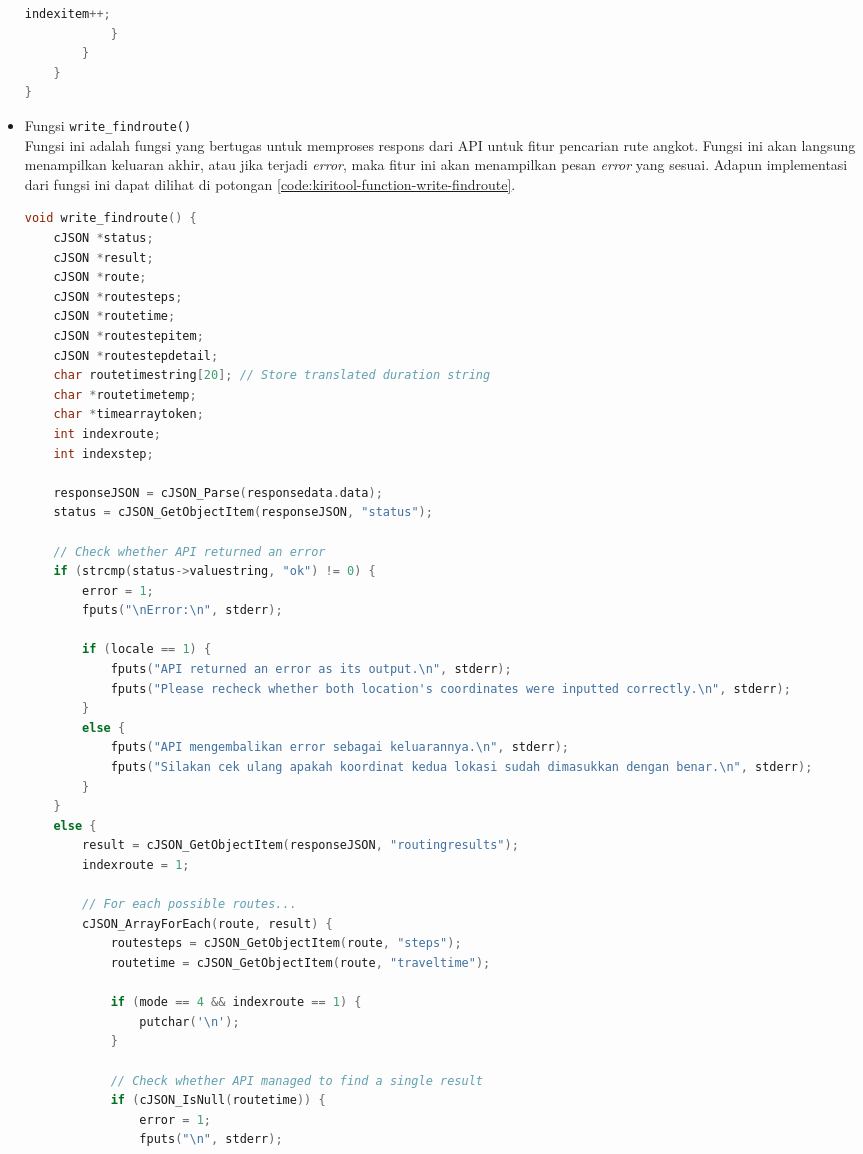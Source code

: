 \begin{itemize}[listparindent=\parindent]
\begin{lstlisting}[language=C, caption=Implementasi fungsi write\textunderscore seachplace(), label=code:kiritool-function-write-search]
                indexitem++;
            }
        }
    }
}
	\end{lstlisting}
	
	\item Fungsi \verb|write_findroute()| \\
	Fungsi ini adalah fungsi yang bertugas untuk memproses respons dari API untuk fitur pencarian rute angkot. Fungsi ini akan langsung menampilkan keluaran akhir, atau jika terjadi \textit{error}, maka fitur ini akan menampilkan pesan \textit{error} yang sesuai. Adapun implementasi dari fungsi ini dapat dilihat di potongan \ref{code:kiritool-function-write-findroute}.
	
	\begin{lstlisting}[language=C, caption=Implementasi fungsi write\textunderscore findroute(), label=code:kiritool-function-write-findroute]
void write_findroute() {
    cJSON *status;
    cJSON *result;
    cJSON *route;
    cJSON *routesteps;
    cJSON *routetime;
    cJSON *routestepitem;
    cJSON *routestepdetail;
    char routetimestring[20]; // Store translated duration string
    char *routetimetemp;
    char *timearraytoken;
    int indexroute;
    int indexstep;

    responseJSON = cJSON_Parse(responsedata.data);
    status = cJSON_GetObjectItem(responseJSON, "status");

    // Check whether API returned an error
    if (strcmp(status->valuestring, "ok") != 0) {
        error = 1;
        fputs("\nError:\n", stderr);

        if (locale == 1) {
            fputs("API returned an error as its output.\n", stderr);
            fputs("Please recheck whether both location's coordinates were inputted correctly.\n", stderr);
        }
        else {
            fputs("API mengembalikan error sebagai keluarannya.\n", stderr);
            fputs("Silakan cek ulang apakah koordinat kedua lokasi sudah dimasukkan dengan benar.\n", stderr);
        }
    }
    else {
        result = cJSON_GetObjectItem(responseJSON, "routingresults");
        indexroute = 1;

        // For each possible routes...
        cJSON_ArrayForEach(route, result) {
            routesteps = cJSON_GetObjectItem(route, "steps");
            routetime = cJSON_GetObjectItem(route, "traveltime");

            if (mode == 4 && indexroute == 1) {
                putchar('\n');
            }

            // Check whether API managed to find a single result
            if (cJSON_IsNull(routetime)) {
                error = 1;
                fputs("\n", stderr);


\end{lstlisting}
\end{itemize}
